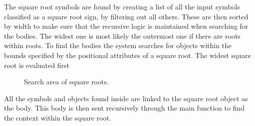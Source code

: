 The square root symbols are found by creating a list of all the input symbols classified as a square root sign, by filtering out all others. These are then sorted by width to make sure that the recursive logic is maintained when searching for the bodies. The widest one is most likely the outermost one if there are roots within roots. To find the bodies the system searches for objects within the bounds specified by the positional attributes of a square root. The widest square root is evaluated first

\begin{figure}[H]
\centering
    \label{fig:interpretation}
\caption{Search area of square roots.}
\end{figure}

All the symbols and objects found inside are linked to the square root object as the body. This body is then sent recursively through the main function to find the context within the square root.


